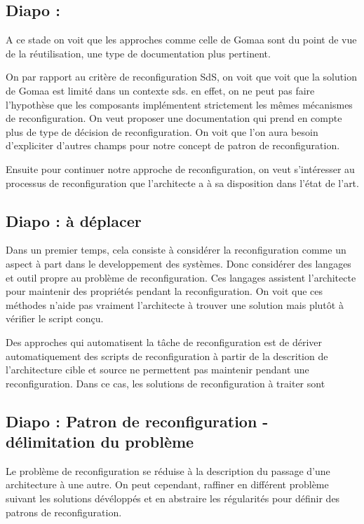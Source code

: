 \subsection{Diapo : }

A ce stade on voit que les approches comme celle de Gomaa sont du
point de vue de la réutilisation, une type de documentation plus
pertinent. 

On par rapport au critère de reconfiguration SdS, on voit que voit que
la solution de Gomaa est limité dans un contexte sds. en effet, on ne
peut pas faire l'hypothèse que les composants implémentent strictement
les mêmes mécanismes de reconfiguration. On veut proposer une
documentation qui prend en compte plus de type de décision de
reconfiguration. On voit que l'on aura besoin d'expliciter d'autres
champs pour notre concept de patron de reconfiguration.

Ensuite pour continuer notre approche de reconfiguration, on veut
s'intéresser au processus de reconfiguration que l'architecte a à sa
disposition dans l'état de l'art. 

\subsection{Diapo : à déplacer }

Dans un premier temps, cela consiste à considérer la reconfiguration
comme un aspect à part dans le developpement des systèmes. 
Donc considérer des langages et outil propre au
problème de reconfiguration. Ces langages assistent l'architecte pour
maintenir des propriétés pendant la reconfiguration. 
On voit que ces méthodes n'aide pas vraiment l'architecte à trouver
une solution mais plutôt à vérifier le script conçu. 

Des approches qui automatisent la tâche de reconfiguration est de
dériver automatiquement des scripts de reconfiguration à partir de la
descrition de l'architecture cible et source ne permettent pas 
maintenir pendant une reconfiguration. Dans ce cas, les solutions de
reconfiguration à traiter sont 

\subsection{Diapo : Patron de reconfiguration - délimitation du problème}

Le problème de reconfiguration se réduise à la description du passage
d'une architecture à une autre. 
On peut cependant, raffiner en différent problème suivant les
solutions dévéloppés et en abstraire les régularités pour définir des
patrons de reconfiguration. 

